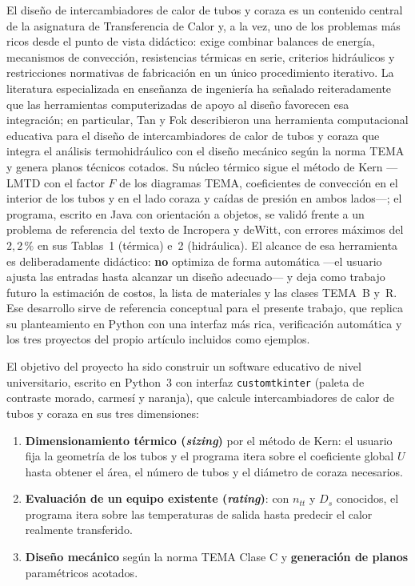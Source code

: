 \documentclass[11pt,a4paper]{article}
\begin{document}
El dise\~no de intercambiadores de calor de tubos y coraza es un contenido
central de la asignatura de Transferencia de Calor y, a la vez, uno de los
problemas m\'as ricos desde el punto de vista did\'actico: exige combinar
balances de energ\'ia, mecanismos de convecci\'on, resistencias t\'ermicas en
serie, criterios hidr\'aulicos y restricciones normativas de fabricaci\'on en un
\'unico procedimiento iterativo. La literatura especializada en ense\~nanza de
ingenier\'ia ha se\~nalado reiteradamente que las herramientas
computerizadas de apoyo al dise\~no favorecen esa integraci\'on; en particular,
Tan y Fok \cite{tanfok} describieron una herramienta computacional educativa
para el dise\~no de intercambiadores de calor de tubos y coraza que integra
el an\'alisis termohidr\'aulico con el dise\~no mec\'anico seg\'un la norma
TEMA y genera planos t\'ecnicos cotados. Su n\'ucleo t\'ermico sigue el
m\'etodo de Kern ---LMTD con el factor $F$ de los diagramas TEMA,
coeficientes de convecci\'on en el interior de los tubos y en el lado coraza
y ca\'idas de presi\'on en ambos lados---; el programa, escrito en Java con
orientaci\'on a objetos, se valid\'o frente a un problema de referencia del
texto de Incropera y deWitt, con errores m\'aximos del $2{,}2\,\%$ en sus
Tablas~1 (t\'ermica) e~2 (hidr\'aulica). El alcance de esa herramienta es
deliberadamente did\'actico: \textbf{no} optimiza de forma autom\'atica
---el usuario ajusta las entradas hasta alcanzar un dise\~no adecuado--- y
deja como trabajo futuro la estimaci\'on de costos, la lista de materiales y
las clases TEMA~B y~R. Ese desarrollo sirve de referencia conceptual para el
presente trabajo, que replica su planteamiento en Python con una interfaz
m\'as rica, verificaci\'on autom\'atica y los tres proyectos del propio
art\'iculo incluidos como ejemplos.

El objetivo del proyecto ha sido construir un software educativo
de nivel universitario, escrito en Python~3 con interfaz \texttt{customtkinter} (paleta de contraste morado, carmes\'i y naranja), que
calcule intercambiadores de calor de tubos y coraza en sus tres dimensiones:
\begin{enumerate}[leftmargin=1.4em]
\item \textbf{Dimensionamiento t\'ermico (\emph{sizing})} por el m\'etodo de
Kern: el usuario fija la geometr\'ia de los tubos y el programa itera sobre el
coeficiente global $U$ hasta obtener el \'area, el n\'umero de tubos y el
di\'ametro de coraza necesarios.
\item \textbf{Evaluaci\'on de un equipo existente (\emph{rating})}: con
$n_{tt}$ y $D_s$ conocidos, el programa itera sobre las temperaturas de salida
hasta predecir el calor realmente transferido.
\item \textbf{Dise\~no mec\'anico} seg\'un la norma TEMA Clase C y
\textbf{generaci\'on de planos} param\'etricos acotados.
\end{enumerate}
\end{document}
